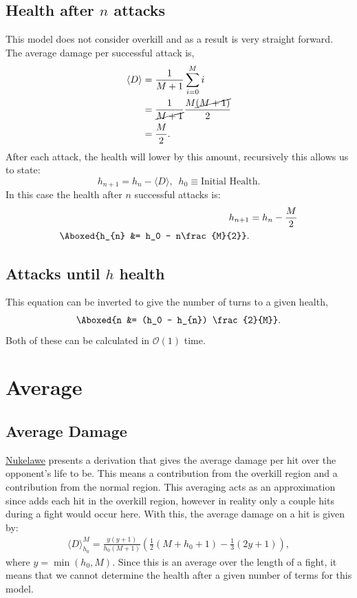 		\subsection{Health after \texorpdfstring{$n$}{} attacks}
			This model does not consider overkill and as a result is very straight forward. The average damage per successful attack is,
			\begin{align}
				\langle D \rangle &= \frac{1}{M+1}\sum_{i=0}^M i\\
					&= \frac{1}{\cancel{M+1}} \frac{M\cancel{(M+1)}}{2}\\
					&= \frac{M}{2}.
			\end{align}
			After each attack, the health will lower by this amount, recursively this allows us to state:
			\begin{equation}
				h_{n+1} = h_{n} - \langle D \rangle,\,\,\,h_0\equiv\text{Initial Health}.
			\end{equation}
			In this case the health after $n$ successful attacks is:
			\begin{align}
				h_{n+1} &= h_{n} - \frac{M}{2}\\
				\Aboxed{h_{n} &= h_0 - n\frac{M}{2}}.
			\end{align}
		\subsection{Attacks until \texorpdfstring{$h$}{} health}
			This equation can be inverted to give the number of turns to a given health,
			\begin{align}
				\Aboxed{n &= (h_0 - h_{n}) \frac{2}{M}}.
			\end{align}
			Both of these can be calculated in $\mathcal{O}(1)$ time.
	
	\section{Average}
		\subsection{Average Damage}
			\href{https://imgur.com/aykEahg}{Nukelawe} presents a derivation that gives the average damage per hit over the opponent's life to be. This means a contribution from the overkill region and a contribution from the normal region. This averaging acts as an approximation since adds each hit in the overkill region, however in reality only a couple hits during a fight would occur here. With this, the average damage on a hit is given by:
			\begin{align}
				\langle D \rangle_{h_0}^M = \frac{y(y+1)}{h_0(M+1)}\left(\frac{1}{2}{(M+h_0+1)}-\frac{1}{3}(2y+1) \right),
			\end{align}
			where $y=\min(h_0, M)$. Since this is an average over the length of a fight, it means that we cannot determine the health after a given number of terms for this model.


